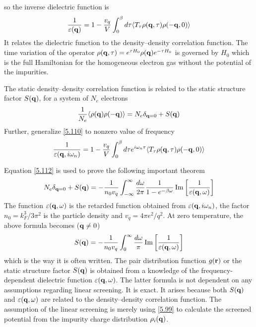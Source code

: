 so the inverse dielectric function is
\begin{equation}
    \frac{1}{\varepsilon(\mathbf{q})} = 1 - \frac{v_q}{V} \int_0^\beta d\tau \langle T_\tau \rho(\mathbf{q},\tau) \rho(-\mathbf{q},0)\rangle    \label{5.110}
\end{equation}
It relates the dielectric function to the density--density correlation function.
The time variation of the operator $\rho(\mathbf{q},\tau) = e^{\tau H_0} \rho(\mathbf{q}) e^{-\tau H_0}$ is governed by $H_0$ which is the full Hamiltonian for the homogeneous electron gas without the potential of the impurities.

The static density--density correlation function is related to the static structure factor $S(\mathbf{q})$, for a system of $N_e$ electrons
\begin{equation}
    \frac{1}{N_e} \langle \rho(\mathbf{q}) \rho(-\mathbf{q}) \rangle = N_e \delta_{\mathbf{q}=0} + S(\mathbf{q})    \label{5.111}
\end{equation}
Further, generalize \eqref{5.110} to nonzero value of frequency
\begin{equation}
    \frac{1}{\varepsilon(\mathbf{q},i\omega_n)} = 1 - \frac{v_q}{V} \int_0^\beta d\tau e^{i\omega_n \tau} \langle T_\tau \rho(\mathbf{q},\tau) \rho(-\mathbf{q},0)\rangle    \label{5.112}
\end{equation}

Equation \eqref{5.112} is used to prove the following important theorem
\begin{equation}
    N_e\delta_{\mathbf{q}=0} + S(\mathbf{q}) = - \frac{1}{n_0 v_q} \int_{-\infty}^\infty \frac{d\omega}{2\pi} \frac{1}{1-e^{-\beta \omega}} \Im\left[ \frac{1}{\varepsilon(\mathbf{q},\omega)} \right]  \label{5.113}
\end{equation}
The function $\varepsilon(\mathbf{q},\omega)$ is the retarded function obtained from $\varepsilon(\mathbf{q},i\omega_n)$, the factor $n_0=k_F^3/3\pi^2$ is the particle density and $v_q = 4\pi e^2/q^2$.
At zero temperature, the above formula becomes ($\mathbf{q}\neq 0$)
\begin{equation}
    S(\mathbf{q}) = - \frac{1}{n_0 v_q} \int_0^\infty \frac{d\omega}{\pi} \Im \left[ \frac{1}{\varepsilon(\mathbf{q},\omega)} \right] \label{5.117}
\end{equation}
which is the way it is often written.
The pair distribution function $g(\mathbf{r})$ or the static structure factor $S(\mathbf{q})$ is obtained from a knowledge of the frequency-dependent dielectric function $\varepsilon(\mathbf{q},\omega)$.
The latter formula is not dependent on any assumptions regarding linear screening.
It is exact.
It arises because both $S(\mathbf{q})$ and $\varepsilon(\mathbf{q},\omega)$ are related to the density--density correlation function.
The assumption of the linear screening is merely using \eqref{5.99} to calculate the screened potential from the impurity charge distribution $\rho_i(\mathbf{q})$.

